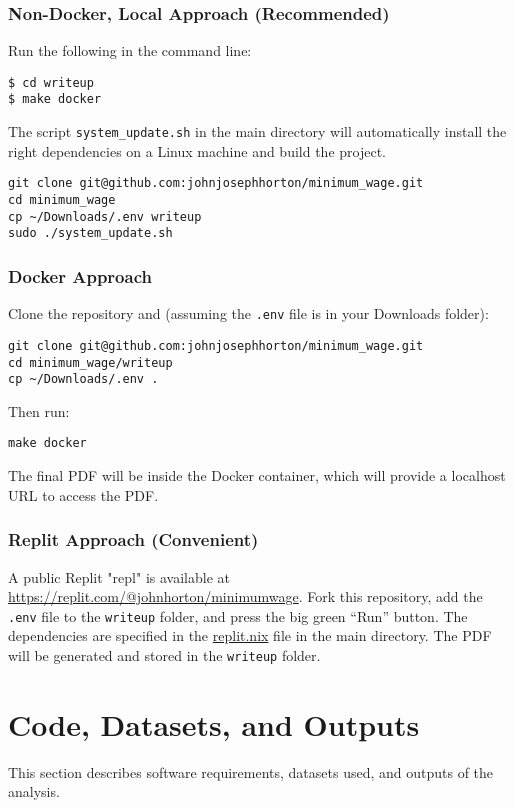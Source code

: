 \documentclass[10pt]{article}
\begin{document}
\subsubsection{Non-Docker, Local Approach (Recommended)}
Run the following in the command line:
\begin{verbatim}
$ cd writeup 
$ make docker
\end{verbatim}
The script \texttt{system\_update.sh} in the main directory will automatically install the right dependencies on a Linux machine and build the project.
\begin{verbatim}
git clone git@github.com:johnjosephhorton/minimum_wage.git
cd minimum_wage
cp ~/Downloads/.env writeup
sudo ./system_update.sh
\end{verbatim}

\subsubsection{Docker Approach}
Clone the repository and (assuming the \texttt{.env} file is in your Downloads folder):
\begin{verbatim}
git clone git@github.com:johnjosephhorton/minimum_wage.git
cd minimum_wage/writeup
cp ~/Downloads/.env .
\end{verbatim}
Then run:
\begin{verbatim}
make docker
\end{verbatim}
The final PDF will be inside the Docker container, which will provide a localhost URL to access the PDF.

\subsubsection{Replit Approach (Convenient)}
A public Replit "repl" is available at \url{https://replit.com/@johnhorton/minimumwage}. Fork this repository, add the \texttt{.env} file to the \texttt{writeup} folder, and press the big green “Run” button. The dependencies are specified in the \href{https://www.github.com/johnjosephhorton/minimum_wage/blob/main/replit.nix.sh}{replit.nix} file in the main directory. The PDF will be generated and stored in the \texttt{writeup} folder.

\section{Code, Datasets, and Outputs}

This section describes software requirements, datasets used, and outputs of the analysis.
\end{document}
